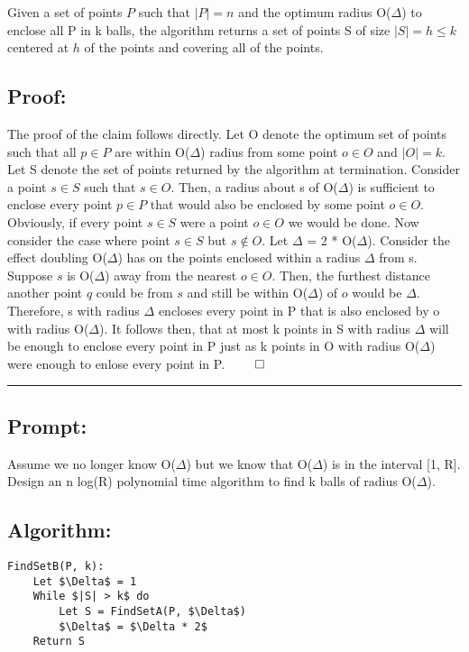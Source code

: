 \documentclass[11pt]{article}
\begin{document}
Given a set of points $P$ such that $|P| = n$ and the optimum radius O($\Delta$) to enclose all P in k balls, the algorithm returns a set of points S of size $|S| = h \leq k$ centered at $h$ of the points and covering all of the points. 

\subsection*{Proof:}

The proof of the claim follows directly. Let O denote the optimum set of points such that all $p \in P$ are within O($\Delta$) radius from some point $o \in O$ and $|O| = k$. Let S denote the set of points returned by the algorithm at termination. Consider a point $s \in S$ such that $s \in O$. Then, a radius about s of O($\Delta$) is sufficient to enclose every point $p \in P$ that would also be enclosed by some point $o \in O$. Obviously, if every point $s \in S$ were a point $o \in O$ we would be done. Now consider the case where point $s \in S$ but $s \not\in O$. Let $\Delta$ =  2 * O($\Delta$). Consider the effect doubling O($\Delta$) has on the points enclosed within a radius $\Delta$ from s. Suppose $s$ is O($\Delta$) away from the nearest $o \in O$. Then, the furthest distance another point $q$ could be from $s$ and still be within O($\Delta$) of $o$ would be $\Delta$. Therefore, s with radius $\Delta$ encloses every point in P that is also enclosed by o with radius O($\Delta$). It follows then, that at most k points in S with radius $\Delta$ will be enough to enclose every point in P just as k points in O with radius O($\Delta$) were enough to enlose every point in P. $\qed$

\noindent\textcolor[RGB]{220,220,220}{\rule{\linewidth}{0.8pt}}

\subsection*{Prompt:}

Assume we no longer know O($\Delta$) but we know that O($\Delta$) is in the interval [1, R]. Design an n log(R) polynomial time algorithm to find k balls of radius O($\Delta$).

\subsection*{Algorithm:}

\begin{lstlisting}[basicstyle=\small, mathescape=true]
FindSetB(P, k):
	Let $\Delta$ = 1
	While $|S| > k$ do
		Let S = FindSetA(P, $\Delta$)
		$\Delta$ = $\Delta * 2$
	Return S
\end{lstlisting}
\end{document}
